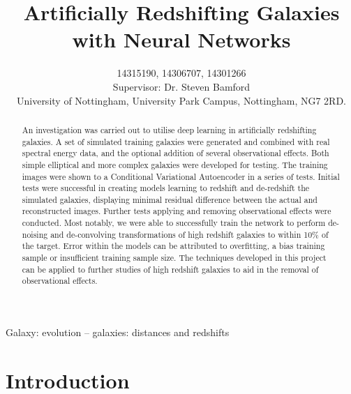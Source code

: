 \documentclass[fleqn,usenatbib]{mnras}
\title[Redshifting Galaxies with Neural Networks]{Artificially Redshifting Galaxies with Neural Networks}
\author[14315190, 14306707, 14301266]{
14315190, 14306707, 14301266
\\
Supervisor: Dr. Steven Bamford\\
University of Nottingham, University Park Campus, Nottingham, NG7 2RD.
}
\begin{document}
\label{firstpage}
\pagerange{\pageref{firstpage}--\pageref{lastpage}}
\maketitle

\begin{abstract}
An investigation was carried out to utilise deep learning in artificially redshifting galaxies. A set of simulated training galaxies were generated and combined with real spectral energy data, and the optional addition of several observational effects. Both simple elliptical and more complex galaxies were developed for testing. The training images were shown to a Conditional Variational Autoencoder in a series of tests. Initial tests were successful in creating models learning to redshift and de-redshift the simulated galaxies, displaying minimal residual difference between the actual and reconstructed images. Further tests applying and removing observational effects were conducted. Most notably, we were able to successfully train the network to perform de-noising and de-convolving transformations of high redshift galaxies to within 10\% of the target. Error within the models can be attributed to overfitting, a bias training sample or insufficient training sample size. The techniques developed in this project can be applied to further studies of high redshift galaxies to aid in the removal of observational effects.


\end{abstract}

\begin{keywords}
Galaxy: evolution -- galaxies: distances and redshifts 
\end{keywords}



\section{Introduction}
\end{document}
